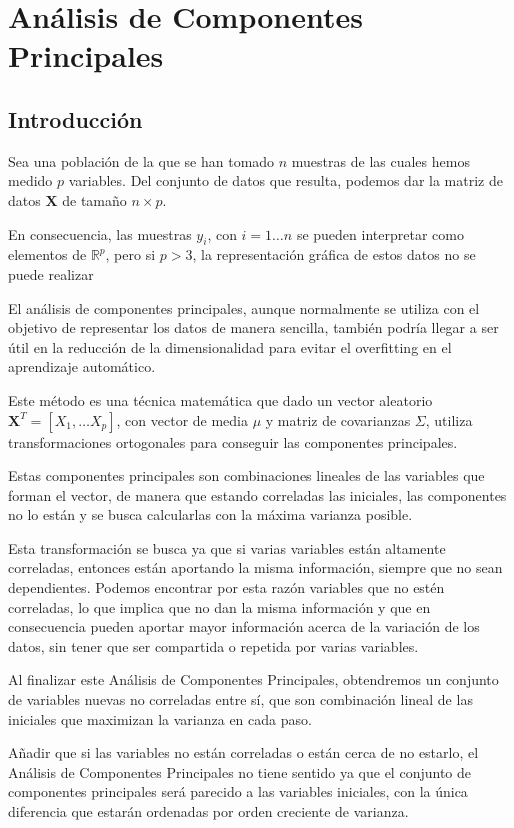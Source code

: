 \chapter{Análisis de Componentes Principales}
\section{Introducción}

\noindent Sea una población de la que se han tomado $n$ muestras de las cuales hemos medido $p$ variables. Del conjunto de datos que resulta, podemos dar la matriz de datos $\mathbf{X}$ de tamaño $n\times p$. 

En consecuencia, las muestras $y_i$, con $i=1\ldots n$ se pueden interpretar como elementos de $\mathbb{R}^p$, pero si $p>3$, la representación gráfica de estos datos no se puede realizar

El análisis de componentes principales, aunque normalmente se utiliza con el objetivo de representar los datos de manera sencilla, también podría llegar a ser útil en la reducción de la dimensionalidad para evitar el overfitting en el aprendizaje automático. 

Este método es una técnica matemática que dado un vector aleatorio $\textbf{X}^T=[X_1,\ldots X_p]$, con vector de media $\mu$ y matriz de covarianzas $\Sigma$, utiliza transformaciones ortogonales para conseguir las componentes principales. 

Estas componentes principales son combinaciones lineales de las variables que forman el vector, de manera que estando correladas las iniciales, las componentes no lo están y se busca calcularlas con la máxima varianza posible. 

Esta transformación se busca ya que si varias variables están altamente correladas, entonces están aportando la misma información, siempre que no sean dependientes. Podemos encontrar por esta razón variables que no estén correladas, lo que implica que no dan la misma información y que en consecuencia pueden aportar mayor información acerca de la variación de los datos, sin tener que ser compartida o repetida por varias variables. 

Al finalizar este Análisis de Componentes Principales, obtendremos un conjunto de variables nuevas no correladas entre sí, que son combinación lineal de las iniciales que maximizan la varianza en cada paso.

Añadir que si las variables no están correladas o están cerca de no estarlo, el Análisis de Componentes Principales no tiene sentido ya que el conjunto de componentes principales será parecido a las variables iniciales, con la única diferencia que estarán ordenadas por orden creciente de varianza.  


